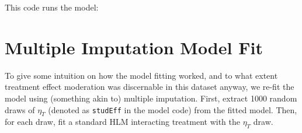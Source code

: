 \documentclass{article}
\begin{document}
This code runs the model:
\begin{kframe}
\begin{alltt}
 \hlkwb{<-} \hlstd{(}\hlstd{,} \hlstd{=}\hlstd{,}\hlstd{=}\hlstd{,}\hlstd{=}\hlstd{)}
\end{alltt}
\end{kframe}

\section{Multiple Imputation Model Fit}

To give some intuition on how the model fitting worked, and to what
extent treatment effect moderation was discernable in this dataset
anyway, we re-fit the model using (something akin to) multiple
imputation.
First, extract 1000 random draws of $\eta_T$ (denoted as
\texttt{studEff} in the model code) from the fitted model.
Then, for each draw, fit a standard HLM interacting treatment with the
$\eta_T$ draw.
\end{document}

